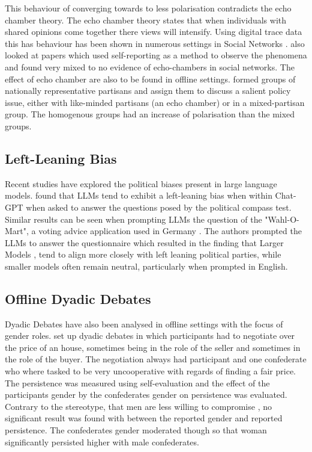This behaviour of converging towards to less polarisation contradicts the echo chamber theory. The echo chamber theory states that when individuals with shared opinions come together there views will intensify. Using digital trace data this has behaviour has been shown in numerous settings in Social Networks \cite{terren2021echo}. \citet{terren2021echo} also looked at papers which used self-reporting as a method to observe the phenomena and found very mixed to no evidence of echo-chambers in social networks. The effect of echo chamber are also to be found in offline settings. \citet{hobolt2024polarizing} formed groups of nationally representative partisans and assign them to discuss a salient policy issue, either with like-minded partisans (an echo chamber) or in a mixed-partisan group. The homogenous groups had an increase of polarisation than the mixed groups.

\subsection{Left-Leaning Bias}

Recent studies have explored the political biases present in large language models. \citet{rutinowski2024self} found that LLMs tend to exhibit a left-leaning bias when within Chat-GPT when asked to answer the questions posed by the political compass test. Similar results can be seen when prompting LLMs the question of the "Wahl-O-Mart", a voting advice application used in Germany \cite{rettenberger2025assessing}. The authors prompted the LLMs to answer the questionnaire which resulted in the finding that Larger Models , tend to align more closely with left leaning political parties, while smaller models often remain neutral, particularly when prompted in English. 

\subsection{Offline Dyadic Debates}

Dyadic Debates have also been analysed in offline settings with the focus of gender roles. \citet{bowles2010gender} set up dyadic debates in which participants had to negotiate over the price of an house, sometimes being in the role of the seller and sometimes in the role of the buyer. The negotiation always had participant and one confederate who where tasked to be very uncooperative with regards of finding a fair price. The persistence was measured using self-evaluation and the effect of the participants gender by the confederates gender on persistence was evaluated. Contrary to the stereotype, that men are less willing to compromise \cite{kray2001battle}, no significant result was found with between the reported gender and reported persistence. The confederates gender moderated though so that woman significantly persisted higher with male confederates. 




